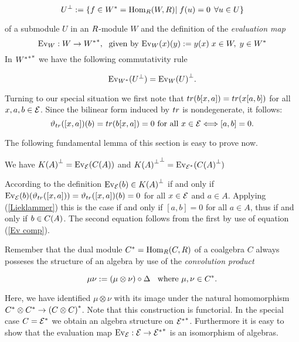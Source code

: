 \documentclass[twoside,12pt]{article}
\begin{document}
\[
{U}^{\bot}:=\{f \in {W}^*={\rm Hom}_{R}{(W,R)}| \; f(u)=0 \; \, \forall u \in U\}
\]

of a submodule $U$ in an $R$-module $W$ and the definition of the {\em
  evaluation map}
\[{\rm Ev}_{W}:W \rightarrow {{W}^*}^*, \;\mbox{ given by }
{\rm Ev}_{W}(x)(y):=y(x)\; x \in W, \; y \in {W}^*\] 
In ${{{W}^*}^*}^*$ we have the following commutativity rule

\begin{equation} \label{Ev comp}
{\rm Ev}_{{W}^*}({U}^{\bot})={{\rm Ev}_{W}(U)}^{\bot}.
\end{equation}

Turning to our special situation we first note that 
$tr(b[x,a])=tr(x[a,b])$ for all $x, a, b \in {\cal E}$. Since the bilinear form
induced by $tr$ is nondegenerate, it follows:
\begin{equation} \label{Lieklammer}
{\vartheta}_{tr}([x,a])(b)=tr(b[x,a])=0 \mbox{ for all } x \in{\cal E} \Longleftrightarrow [a,b]=0.
\end{equation}

The following fundamental lemma of this section is easy to prove now.

\begin{lem} \label{duales Komplement}
We have ${K(A)}^{\bot} ={\rm Ev}_{{\cal E}}(C(A))$ and
${{K(A)}^{\bot}}^{\bot} ={\rm Ev}_{{{\cal E}}^*}({C(A)}^{\bot})$
\end{lem}

\begin{Pf}
According to the definition ${\rm Ev}_{{\cal E}}(b)\in {K(A)}^{\bot}$ if and only if
${\rm Ev}_{{\cal E}}(b)({\vartheta}_{tr}([x,a]))={\vartheta}_{tr}([x,a])(b)=0$ for all $x \in {\cal E}$
and $a\in A$. Applying (\ref{Lieklammer}) this is the case if and only if
$[a,b]=0$ for all $a \in A$, thus if and only if
$b \in C(A)$. The second equation follows from the first by use of
equation (\ref{Ev comp}).
\end{Pf}

Remember that the dual module
${C}^*={\rm Hom}_{R}{(C,R)}$ of a coalgebra $C$ always posseses the structure
of an algebra by use of the {\em convolution product} 

\[ \mu \nu :=(\mu \otimes \nu) \circ\Delta \;\;\mbox{ where }
\mu ,\nu \in {C}^*.
 \]

Here, we have identified $\mu \otimes \nu$ with its image under the
natural homomorphism
${C}^* \otimes {C}^* \rightarrow {(C \otimes C)}^*$. Note that this 
construction is functorial. In the special case
$C={{\cal E}}^*$ we obtain an algebra structure on ${{{\cal E}}^*}^*$. Furthermore
it is easy to show that the evaluation map
${\rm Ev}_{{\cal E}}:{\cal E}\rightarrow{{{\cal E}}^*}^*$ is an isomorphism of algebras.
\end{document}
